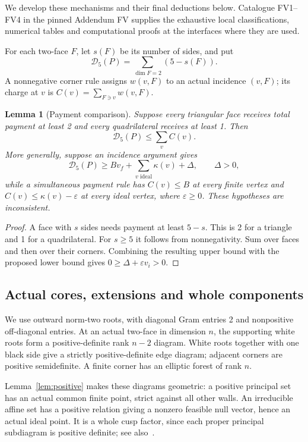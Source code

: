 \documentclass[11pt]{article}
\newtheorem{lemma}[theorem]{Lemma}
\theoremstyle{remark}\newtheorem{remark}[theorem]{Remark}
\numberwithin{equation}{section}
\newcommand{\Dfive}{\mathcal D_5}
\begin{document}
We develop these mechanisms and their final deductions below.
Catalogue FV1--FV4 in the pinned Addendum FV supplies the exhaustive
local classifications, numerical tables and computational proofs
at the interfaces where they are used.

For each two-face $F$, let $s(F)$ be its number of sides, and put
\[
 \Dfive(P)=\sum_{\dim F=2}(5-s(F)).
\]
A nonnegative corner rule assigns $w(v,F)$ to an actual incidence
$(v,F)$; its charge at $v$ is $C(v)=\sum_{F\ni v}w(v,F)$.

\begin{lemma}[Payment comparison]\label{lem:payment}Suppose every triangular face receives total payment at least 2
and every quadrilateral receives at least 1. Then
 \[
 \Dfive(P)\le\sum_v C(v).
\]
More generally, suppose an incidence argument gives
 \[
 \Dfive(P)\ge Bv_f+\sum_{v\text{ ideal}}\kappa(v)+\Delta,
 \qquad\Delta>0,
\]
while a simultaneous payment rule has $C(v)\le B$ at every finite
vertex and $C(v)\le\kappa(v)-\varepsilon$ at every ideal vertex,
where $\varepsilon\ge0$. These hypotheses are inconsistent.
\end{lemma}
\begin{proof}
A face with $s$ sides needs payment at least $5-s$. This is 2
for a triangle and 1 for a quadrilateral. For $s\ge5$ it follows
from nonnegativity. Sum over faces and then over their corners.
Combining the resulting upper bound with the proposed lower bound
gives $0\ge\Delta+\varepsilon v_i>0$.
\end{proof}


\subsection{Actual cores, extensions and whole components}
\label{fv:sec:finite-interface}
We use outward norm-two roots, with diagonal Gram entries 2 and
nonpositive off-diagonal entries. At an actual two-face in dimension $n$,
the supporting white roots form a positive-definite rank $n-2$ diagram.
White roots together with one black side give a strictly positive-definite
edge diagram; adjacent corners are positive semidefinite. A finite corner
has an elliptic forest of rank $n$.

Lemma~\ref{lem:positive} makes these diagrams geometric: a positive
principal set has an actual common finite point, strict against
all other walls. An irreducible affine set has a positive relation
giving a nonzero feasible null vector, hence an actual ideal point.
It is a whole cusp factor, since each proper principal subdiagram
is positive definite; see also~\cite[Section~1]{FeliksonTumarkin}.
\end{document}
